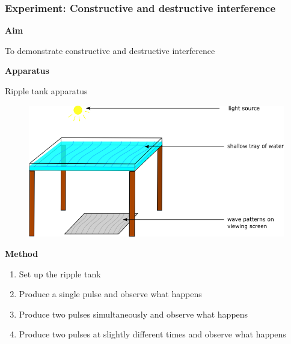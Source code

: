 \label{m38802*eip-791}
            \subsubsection{ Experiment: Constructive and destructive interference}
            \nopagebreak
            \label{m38802*eip-260}\noindent{}\textbf{Aim}

To demonstrate constructive and destructive interference
\par 
\label{m38802*eip7241}\noindent{}\textbf{Apparatus} 

Ripple tank apparatus

    \setcounter{subfigure}{0}


	\begin{figure}[H] %
    \begin{center}
    \label{m38802*id63458!!!underscore!!!media}\label{m38802*id63458!!!underscore!!!printimage}\includegraphics[width=0.8\columnwidth]{col11305.imgs/m38802_rippletray.png} %
        
      \vspace{2pt}
    \vspace{.1in}
    
    \end{center}

 \end{figure}   

    \addtocounter{footnote}{-0}
    \par 
\label{m38802*eip7474}\noindent{}\textbf{Method}
\label{m38802*id6242}\begin{enumerate}[noitemsep, label=\textbf{\arabic*}. ] 
            \item Set up the ripple tank\item Produce a single pulse and observe what happens\item Produce two pulses simultaneously and observe what happens\item Produce two pulses at slightly different times and observe what happens\end{enumerate}
        
